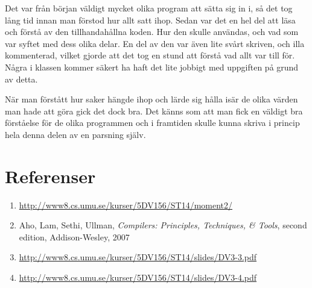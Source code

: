 	Det var från början väldigt mycket olika program att sätta sig in i, så det tog lång tid innan man förstod hur allt satt ihop. Sedan var det en hel del att läsa och förstå av den tillhandahållna koden. Hur den skulle användas, och vad som var syftet med dess olika delar. En del av den var även lite svårt skriven, och illa kommenterad, vilket gjorde att det tog en stund att förstå vad allt var till för. Några i klassen kommer säkert ha haft det lite jobbigt med uppgiften på grund av detta.
	
	När man förstått hur saker hängde ihop och lärde sig hålla isär de olika värden man hade att göra gick det dock bra. Det känns som att man fick en väldigt bra förståelse för de olika programmen och i framtiden skulle kunna skriva i princip hela denna delen av en parsning själv.

\newpage
\section{Referenser}

\begin{enumerate}
  \item  \url{http://www8.cs.umu.se/kurser/5DV156/ST14/moment2/}
  \item Aho, Lam, Sethi, Ullman, \textit{Compilers: Principles, Techniques, \& Tools}, second edition, Addison-Wesley, 2007
  \item \url{http://www8.cs.umu.se/kurser/5DV156/ST14/slides/DV3-3.pdf}
  \item \url{http://www8.cs.umu.se/kurser/5DV156/ST14/slides/DV3-4.pdf}
\end{enumerate}





